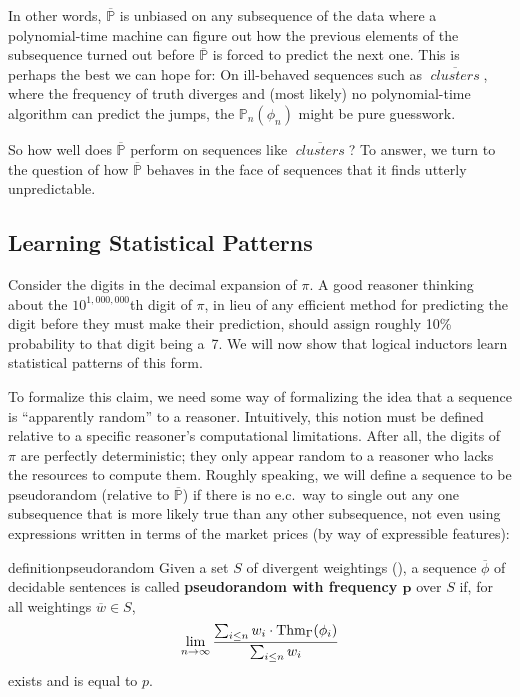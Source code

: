 \documentclass[authordate,onecolumn,noenvironments]{miri-tech-article}
\numberwithin{equation}{subsection}
\newcommand{\seq}[1]{{\overline{#1}}}
\newcommand{\prob}{p}
\newcommand{\nn}{n}
\newcommand{\fuz}{w}
\newcommand{\phis}{\seq{\phi}}
\newcommand{\ec}[1][\ ]{e.c.#1}
\newcommand{\BelState}{\mathbb{P}}
\newcommand{\pt}{\BelState}
\newcommand{\MP}{\seq{\pt}}
\newcommand{\Theory}{\Gamma}
\newcommand{\clusters}{\mathit{\operatorname{clusters}}}
\newcommand{\thmind}[1][\Theory]{\operatorname{Thm}_{#1}\-} %
\begin{document}
\noindent In other words, $\MP$ is unbiased on any subsequence of the data where a polynomial-time machine can figure out how the previous elements of the subsequence turned out before $\MP$ is forced to predict the next one. This is perhaps the best we can hope for: On ill-behaved sequences such as $\seq\clusters$, where the frequency of truth diverges and (most likely) no polynomial-time algorithm can predict the jumps, the $\pt_\nn(\phi_\nn)$ might be pure guesswork.

So how well does $\MP$ perform on sequences like $\seq\clusters$? To answer, we turn to the question of how $\MP$ behaves in the face of sequences that it finds utterly unpredictable.


\subsection{Learning Statistical Patterns}\label{sec:statpatterns}

Consider the digits in the decimal expansion of $\pi$. A good reasoner thinking about the $10^{1,000,000}$th digit of $\pi$, in lieu of any efficient method for predicting the digit before they must make their prediction, should assign roughly 10\% probability to that digit being a~7. We will now show that logical inductors learn statistical patterns of this form.

To formalize this claim, we need some way of formalizing the idea that a sequence is ``apparently random'' to a reasoner. Intuitively, this notion must be defined relative to a specific reasoner's computational limitations. After all, the digits of $\pi$ are perfectly deterministic; they only appear random to a reasoner who lacks the resources to compute them. Roughly speaking, we will define a sequence to be pseudorandom (relative to $\MP$) if there is no \ec way to single out any one subsequence that is more likely true than any other subsequence, not even using expressions written in terms of the market prices (by way of expressible features):

\begin{restatable}{definition}{pseudorandom}\label{def:pseudorandom}
  Given a set $S$ of divergent weightings (), a sequence $\phis$ of decidable sentences is called \textbf{pseudorandom with frequency $\bm{\prob}$} over $S$ if, for all weightings $\seq\fuz\in S$,
  \[
    \lim_{\nn \to\infty} \frac{\sum_{i \leq \nn} \fuz_i \cdot \thmind(\phi_i)}{\sum_{i \leq n} \fuz_i}
  \]
  exists and is equal to $\prob$.
\end{restatable}
\end{document}
